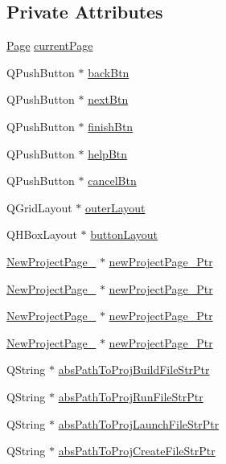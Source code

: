 \subsection*{Private Attributes}
\begin{DoxyCompactItemize}
\item 
\hyperlink{class_new_project_gui_a7dd25d019611ddc0fd2b357e0f3a446c}{Page} \hyperlink{class_new_project_gui_ac1b0414d92030b3d545020fc889b1313}{current\-Page}
\item 
Q\-Push\-Button $\ast$ \hyperlink{class_new_project_gui_a9dd8fc63be73f0aa6f7c61349dff95a2}{back\-Btn}
\item 
Q\-Push\-Button $\ast$ \hyperlink{class_new_project_gui_af79d8f88c0d0aa8e783240c2e6ba6e8b}{next\-Btn}
\item 
Q\-Push\-Button $\ast$ \hyperlink{class_new_project_gui_ab5d0c64c04e2c9c1ff6e57191e35f79f}{finish\-Btn}
\item 
Q\-Push\-Button $\ast$ \hyperlink{class_new_project_gui_a33ab8b2813bd5f5ae52c7d91c996f61f}{help\-Btn}
\item 
Q\-Push\-Button $\ast$ \hyperlink{class_new_project_gui_a91a081ae496b19cd64dd33b292b1761e}{cancel\-Btn}
\item 
Q\-Grid\-Layout $\ast$ \hyperlink{class_new_project_gui_ab8c8c2da1803bbbc90d8aa5e90ac9aec}{outer\-Layout}
\item 
Q\-H\-Box\-Layout $\ast$ \hyperlink{class_new_project_gui_a7281efc1048f02fae1610c1fa0925473}{button\-Layout}
\item 
\hyperlink{class_new_project_page__1}{New\-Project\-Page\-\_} $\ast$ \hyperlink{class_new_project_gui_a21cb8b6c6a0b743e7bdc2e4e4ff7e839}{new\-Project\-Page\-\_\-Ptr}
\item 
\hyperlink{class_new_project_page__2}{New\-Project\-Page\-\_} $\ast$ \hyperlink{class_new_project_gui_a4437d1c791747dcf286ef389f952116a}{new\-Project\-Page\-\_\-Ptr}
\item 
\hyperlink{class_new_project_page__3}{New\-Project\-Page\-\_} $\ast$ \hyperlink{class_new_project_gui_a16ff0aedd402588686ae3f02b4226fc0}{new\-Project\-Page\-\_\-Ptr}
\item 
\hyperlink{class_new_project_page__4}{New\-Project\-Page\-\_} $\ast$ \hyperlink{class_new_project_gui_a4c4e20d7598c3c61a45eb51a0332a326}{new\-Project\-Page\-\_\-Ptr}
\item 
Q\-String $\ast$ \hyperlink{class_new_project_gui_aa985b9da4028bea4f10e76d116955c4e}{abs\-Path\-To\-Proj\-Build\-File\-Str\-Ptr}
\item 
Q\-String $\ast$ \hyperlink{class_new_project_gui_ad8f25243a46ce10b6f1bc0c9ddb3e7eb}{abs\-Path\-To\-Proj\-Run\-File\-Str\-Ptr}
\item 
Q\-String $\ast$ \hyperlink{class_new_project_gui_a9056b4e1033cde862dd86bac6c0c6070}{abs\-Path\-To\-Proj\-Launch\-File\-Str\-Ptr}
\item 
Q\-String $\ast$ \hyperlink{class_new_project_gui_ab0c9525363d1b0b8ed2aef874307852e}{abs\-Path\-To\-Proj\-Create\-File\-Str\-Ptr}
\end{DoxyCompactItemize}


